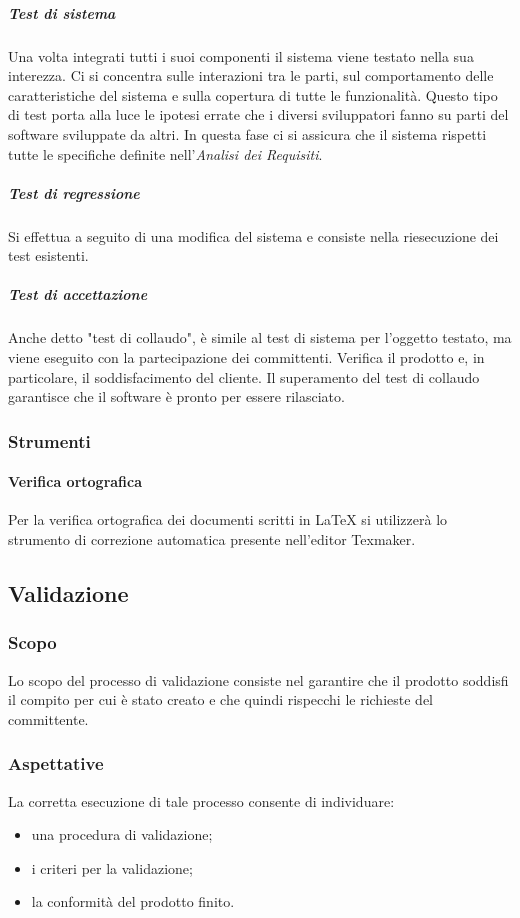 			\subparagraph{Test di sistema}
			Una volta integrati tutti i suoi componenti il sistema viene testato nella sua interezza. Ci si concentra sulle interazioni tra le parti, sul comportamento delle caratteristiche del sistema e sulla copertura di tutte le funzionalità. Questo tipo di test porta alla luce le ipotesi errate che i diversi sviluppatori fanno su parti del software sviluppate da altri. In questa fase ci si assicura che il sistema rispetti tutte le specifiche definite nell'\textit{Analisi dei Requisiti}.
			\subparagraph{Test di regressione}
			Si effettua a seguito di una modifica del sistema e consiste nella riesecuzione dei test esistenti.
			\subparagraph{Test di accettazione}
			Anche detto "test di collaudo", è simile al test di sistema per l’oggetto testato, ma viene eseguito con la partecipazione dei committenti. Verifica il prodotto e, in particolare, il soddisfacimento del cliente. Il superamento del test di collaudo garantisce che il software è pronto per essere rilasciato.
			\subsubsection{Strumenti}
			\paragraph{Verifica ortografica}
			Per la verifica ortografica dei documenti scritti in \LaTeX{} si utilizzerà lo strumento di correzione automatica presente nell’editor Texmaker.

	\subsection{Validazione}
		\subsubsection{Scopo}
			Lo scopo del processo di validazione consiste nel garantire che il prodotto soddisfi il compito per cui è stato creato e che quindi rispecchi le richieste del committente.
		\subsubsection{Aspettative}
			La corretta esecuzione di tale processo consente di individuare:
			\begin{itemize}
				\item una procedura di validazione;
				\item i criteri per la validazione;
				\item la conformità del prodotto finito.
			\end{itemize}
